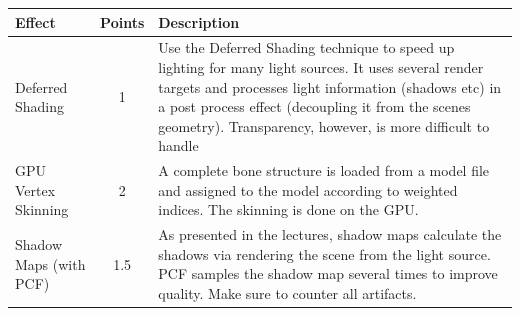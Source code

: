 \documentclass[12pt]{article}
\begin{document}
\begin{table}[h!]
	\centering
	\label{table1}
	\begin{tabular}{p{3cm} | c | p{12cm}}
		Effect & Points & Description\\
		\hline
		Deferred Shading & 1 & Use the Deferred Shading technique to speed up lighting for many light sources. 
		It uses several render targets and processes light information (shadows etc) in a post process effect (decoupling it from the scenes geometry). 
		Transparency, however, is more difficult to handle	\\
		\hline
GPU Vertex Skinning &	2 &	A complete bone structure is loaded from a model file and assigned to the model according to weighted indices. 
		The skinning is done on the GPU. \\
		\hline
		Shadow Maps (with PCF) & 1.5 & As presented in the lectures, shadow maps calculate the shadows via rendering the scene from the light source. 
		PCF samples the shadow map several times to improve quality. 
		Make sure to counter all artifacts.\\		
		\hline
	\end{tabular}
\end{table}
\end{document}
